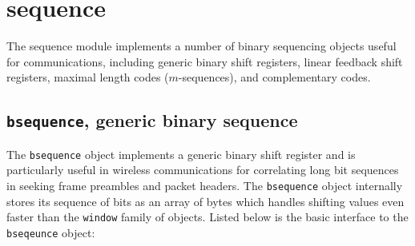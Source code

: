 % 
%

\newpage
\section{sequence}
\label{module:sequence}
The sequence module implements a number of binary sequencing objects
useful for communications,
including
generic binary shift registers,
linear feedback shift registers,
maximal length codes ($m$-sequences),
and
complementary codes.

\subsection{{\tt bsequence}, generic binary sequence}
\label{module:sequence:bsequence}
The {\tt bsequence} object implements a generic binary shift register
and is particularly useful in wireless communications for correlating long
bit sequences in seeking frame preambles and packet headers.
The {\tt bsequence} object internally stores its sequence of bits as an array
of bytes which handles shifting values even faster than the {\tt window}
family of objects.
%
Listed below is the basic interface to the {\tt bseqeunce} object:
%
